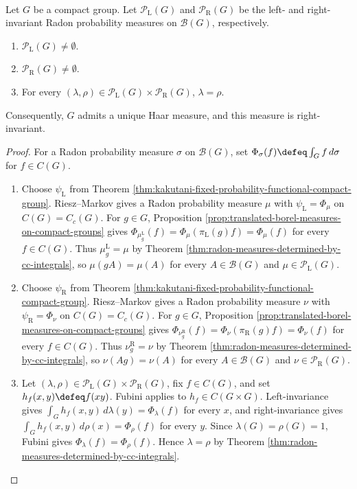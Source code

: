\begin{theorem} \label{thm:haar-measure-on-compact-groups} \\
Let $G$ be a compact group. Let $\mathcal{P}_{\mathrm{L}}(G)$ and $\mathcal{P}_{\mathrm{R}}(G)$ be the left- and right-invariant Radon probability measures on $\mathcal{B}(G)$, respectively.
\begin{enumerate}[label=(\roman*)]
\setlength{\itemsep}{0pt}
\item $\mathcal{P}_{\mathrm{L}}(G)\neq\emptyset$.
\item $\mathcal{P}_{\mathrm{R}}(G)\neq\emptyset$.
\item For every $(\lambda,\rho)\in\mathcal{P}_{\mathrm{L}}(G)\times\mathcal{P}_{\mathrm{R}}(G)$, $\lambda=\rho$.
\end{enumerate}
Consequently, $G$ admits a unique Haar measure, and this measure is right-invariant.
\begin{proof}
For a Radon probability measure $\sigma$ on $\mathcal{B}(G)$, set $\Phi_\sigma(f)\defeq\int_G f\,d\sigma$ for $f\in C(G)$.
\begin{enumerate}[label=(\roman*)]
\setlength{\itemsep}{0pt}
\item Choose $\psi_{\mathrm{L}}$ from Theorem \ref{thm:kakutani-fixed-probability-functional-compact-group}. Riesz--Markov gives a Radon probability measure $\mu$ with $\psi_{\mathrm{L}}=\Phi_\mu$ on $C(G)=C_c(G)$. For $g\in G$, Proposition \ref{prop:translated-borel-measures-on-compact-groups} gives $\Phi_{\mu_g^{\mathrm{L}}}(f)=\Phi_\mu(\pi_{\mathrm{L}}(g)f)=\Phi_\mu(f)$ for every $f\in C(G)$. Thus $\mu_g^{\mathrm{L}}=\mu$ by Theorem \ref{thm:radon-measures-determined-by-cc-integrals}, so $\mu(gA)=\mu(A)$ for every $A\in\mathcal{B}(G)$ and $\mu\in\mathcal{P}_{\mathrm{L}}(G)$.
\item Choose $\psi_{\mathrm{R}}$ from Theorem \ref{thm:kakutani-fixed-probability-functional-compact-group}. Riesz--Markov gives a Radon probability measure $\nu$ with $\psi_{\mathrm{R}}=\Phi_\nu$ on $C(G)=C_c(G)$. For $g\in G$, Proposition \ref{prop:translated-borel-measures-on-compact-groups} gives $\Phi_{\nu_g^{\mathrm{R}}}(f)=\Phi_\nu(\pi_{\mathrm{R}}(g)f)=\Phi_\nu(f)$ for every $f\in C(G)$. Thus $\nu_g^{\mathrm{R}}=\nu$ by Theorem \ref{thm:radon-measures-determined-by-cc-integrals}, so $\nu(Ag)=\nu(A)$ for every $A\in\mathcal{B}(G)$ and $\nu\in\mathcal{P}_{\mathrm{R}}(G)$.
\item Let $(\lambda,\rho)\in\mathcal{P}_{\mathrm{L}}(G)\times\mathcal{P}_{\mathrm{R}}(G)$, fix $f\in C(G)$, and set $h_f(x,y)\defeq f(xy)$. Fubini applies to $h_f\in C(G\times G)$. Left-invariance gives $\int_G h_f(x,y)\,d\lambda(y)=\Phi_\lambda(f)$ for every $x$, and right-invariance gives $\int_G h_f(x,y)\,d\rho(x)=\Phi_\rho(f)$ for every $y$. Since $\lambda(G)=\rho(G)=1$, Fubini gives $\Phi_\lambda(f)=\Phi_\rho(f)$. Hence $\lambda=\rho$ by Theorem \ref{thm:radon-measures-determined-by-cc-integrals}.

\end{enumerate}
\end{proof}
\end{theorem}

